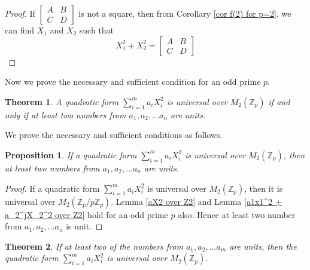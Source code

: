 \documentclass[12pt,a4paper]{article}
\newtheorem{thm}{Theorem}[section]
\newtheorem{prop}{Proposition}[section]
\begin{document}
	\begin{proof}
		If $\begin{bmatrix}
			A & B \\
			C & D
		\end{bmatrix}$ is not a square, then from Corollary \ref{cor f(2) for p=2}, we can find $X_1$ and $X_2$ such that 
		\begin{equation*}
			X_1^2 + X_2^2= \begin{bmatrix}
				A & B\\
				C& D
			\end{bmatrix}
		\end{equation*}
	\end{proof}
	Now we prove the necessary and sufficient condition for an odd prime $p$.
	\begin{thm} \label{necce and suff condition main thm odd p}
		A quadratic form $\sum_{i=1}^{m} a_iX_i^2$ is universal over $M_2(\mathbb{Z}_p)$ if and only if at least two numbers from $a_1,a_2, \ldots a_n$ are units.
	\end{thm}
	We prove the necessary and sufficient conditions as follows.
	\begin{prop}\label{necce condition main thm odd p}
		If a quadratic form $\sum_{i=1}^{m} a_iX_i^2$ is universal over $M_2(\mathbb{Z}_p)$, then at least two numbers from $a_1,a_2, \ldots a_n$ are units.
	\end{prop}
	\begin{proof}
		 If a quadratic form $\sum_{i=1}^{m} a_iX_i^2$ is universal over $M_2(\mathbb{Z}_p)$, then it is universal over $M_2(\mathbb{Z}_p/p\mathbb{Z}_p)$. Lemma \ref{aX2 over Z2} and Lemma \ref{a1x1^2 + a_2^jX_2^2 over Z2} hold for an odd prime $p$ also. Hence at least two number from $a_1,a_2, \ldots a_n$ is unit.
	\end{proof}
	\begin{thm} \label{Zp sufficient case}
		If at least two of the numbers from $a_1,a_2, \ldots a_m$ are units, then the quadratic form $\sum_{i=1}^{m} a_iX_i^2$ is universal over $M_2(\mathbb{Z}_p)$.
	\end{thm}
\end{document}
